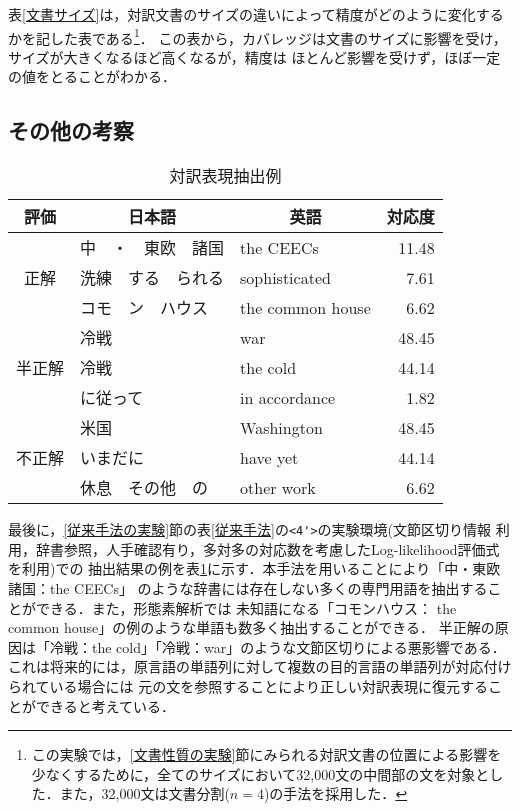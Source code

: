 表\ref{文書サイズ}は，対訳文書のサイズの違いによって精度がどのように変化するかを記した表である\footnote{この実験では，\ref{文書性質の実験}節にみられる対訳文書の位置による影響を少なくするために，全てのサイズにおいて32,000文の中間部の文を対象とした．また，32,000文は文書分割($n=4$)の手法を採用した．}．
この表から，カバレッジは文書のサイズに影響を受け，サイズが大きくなるほど高くなるが，精度は
ほとんど影響を受けず，ほぼ一定の値をとることがわかる．

\subsection{その他の考察}


\begin{table}[t]
\caption{対訳表現抽出例}
\label{対訳表現抽出例}
\begin{center}
\begin{tabular}{c||ll|r}
\hline
評価 & \multicolumn{1}{|c}{日本語} & \multicolumn{1}{c}{英語} & \multicolumn{1}{|c}{対応度} \\ 
\hline
      & 中　・　東欧　諸国     & the CEECs            & 11.48 \\
 正解 & 洗練　する　られる     & sophisticated        &  7.61 \\
      & コモ　ン　ハウス       & the common house     &  6.62 \\
\hline
      & 冷戦                   & war                  & 48.45 \\
半正解& 冷戦                   & the cold             & 44.14 \\
      & に従って               & in accordance        &  1.82 \\
\hline
      & 米国                   & Washington           & 48.45 \\
不正解& いまだに               & have yet             & 44.14 \\
      & 休息　その他　の       & other work           &  6.62 \\
\hline
\end{tabular}
\end{center}
\end{table}

最後に，\ref{従来手法の実験}節の表\ref{従来手法}の\verb|<4'>|の実験環境(文節区切り情報
利用，辞書参照，人手確認有り，多対多の対応数を考慮したLog-likelihood評価式を利用)での
抽出結果の例を表\ref{対訳表現抽出例}に示す．本手法を用いることにより「中・東欧諸国：the CEECs」
のような辞書には存在しない多くの専門用語を抽出することができる．また，形態素解析では
未知語になる「コモンハウス： the common house」の例のような単語も数多く抽出することができる．
半正解の原因は「冷戦：the cold」「冷戦：war」のような文節区切りによる悪影響である．
これは将来的には，原言語の単語列に対して複数の目的言語の単語列が対応付けられている場合には
元の文を参照することにより正しい対訳表現に復元することができると考えている．

